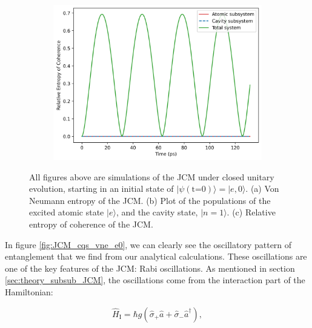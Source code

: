 \documentclass[11pt]{article}
\begin{document}
\begin{figure}[h]
    \begin{subfigure}{0.45\textwidth}
        \centering
        \includegraphics[width=\linewidth]{Research Project/Code/results/JCM/CQS_coh.png}
        \caption{}
        \label{fig:JCM_cqs_coh_e0}
    \end{subfigure}
    \hfill
    \caption{All figures above are simulations of the JCM under closed unitary evolution, starting in an initial state of $|\psi (\text{t=0})\rangle = |e, 0\rangle$. (a) Von Neumann entropy of the JCM. (b) Plot of the populations of the excited atomic state $|e\rangle$, and the cavity state, $|n=1\rangle$. (c) Relative entropy of coherence of the JCM.}
\end{figure}

In figure \ref{fig:JCM_cqs_vne_e0}, we can clearly see the oscillatory pattern of entanglement that we find from our analytical calculations. These oscillations are one of the key features of the JCM: Rabi oscillations. As mentioned in section \ref{sec:theory_subsub_JCM}, the oscillations come from the interaction part of the Hamiltonian:

\begin{equation*}
     \hat{H}_{\scriptscriptstyle \text{I}} = \hbar g(\hat{\sigma}_{+}\hat{a} +\hat{\sigma}_{-}\hat{a}^\dagger),
\end{equation*}
\end{document}
